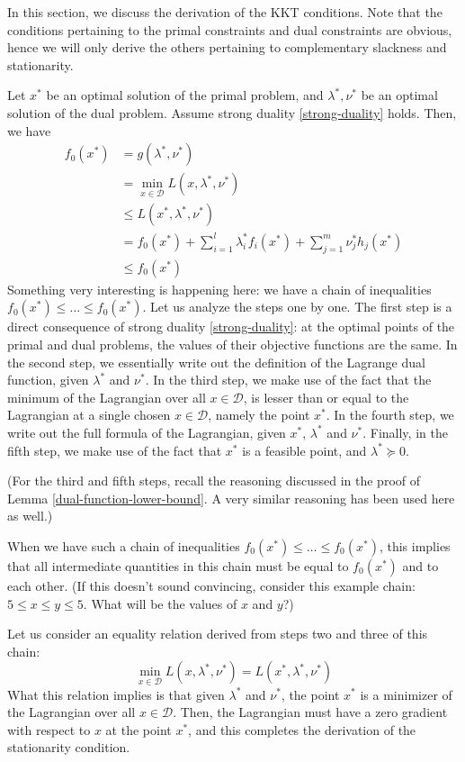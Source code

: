 \documentclass[a4paper]{article}
\theoremstyle{definition}
\begin{document}
In this section, we discuss the derivation of the KKT conditions.
Note that the conditions pertaining to the primal constraints and dual constraints are obvious, hence we will only derive the others pertaining to complementary slackness and stationarity.

Let $x^*$ be an optimal solution of the primal problem, and $\lambda^*, \nu^*$ be an optimal solution of the dual problem.
Assume strong duality \eqref{strong-duality} holds.
Then, we have
\begin{align*}
	f_0(x^*) & = g(\lambda^*, \nu^*) \\
	& = \min_{x \in \mathcal{D}} L(x, \lambda^*, \nu^*) \\
	& \leq L(x^*, \lambda^*, \nu^*) \\
	& = f_0(x^*) + \sum_{i=1}^l \lambda_i^* f_i(x^*) + \sum_{j=1}^m \nu_j^* h_j(x^*) \\
	& \leq f_0(x^*)
\end{align*}
Something very interesting is happening here: we have a chain of inequalities $f_0(x^*) \leq \dots \leq f_0(x^*)$.
Let us analyze the steps one by one.
The first step is a direct consequence of strong duality \eqref{strong-duality}: at the optimal points of the primal and dual problems, the values of their objective functions are the same.
In the second step, we essentially write out the definition of the Lagrange dual function, given $\lambda^*$ and $\nu^*$.
In the third step, we make use of the fact that the minimum of the Lagrangian over all $x \in \mathcal{D}$, is lesser than or equal to the Lagrangian at a single chosen $x \in \mathcal{D}$, namely the point $x^*$.
In the fourth step, we write out the full formula of the Lagrangian, given $x^*$, $\lambda^*$ and $\nu^*$.
Finally, in the fifth step, we make use of the fact that $x^*$ is a feasible point, and $\lambda^* \succeq 0$.

(For the third and fifth steps, recall the reasoning discussed in the proof of Lemma \ref{dual-function-lower-bound}.
A very similar reasoning has been used here as well.)

When we have such a chain of inequalities $f_0(x^*) \leq \dots \leq f_0(x^*)$, this implies that all intermediate quantities in this chain must be equal to $f_0(x^*)$ and to each other.
(If this doesn't sound convincing, consider this example chain: $5 \leq x \leq y \leq 5$.
What will be the values of $x$ and $y$?)

Let us consider an equality relation derived from steps two and three of this chain:
\begin{equation*}
	\min_{x \in \mathcal{D}} L(x, \lambda^*, \nu^*) = L(x^*, \lambda^*, \nu^*)
\end{equation*}
What this relation implies is that given $\lambda^*$ and $\nu^*$, the point $x^*$ is a minimizer of the Lagrangian over all $x \in \mathcal{D}$.
Then, the Lagrangian must have a zero gradient with respect to $x$ at the point $x^*$, and this completes the derivation of the stationarity condition.
\end{document}
